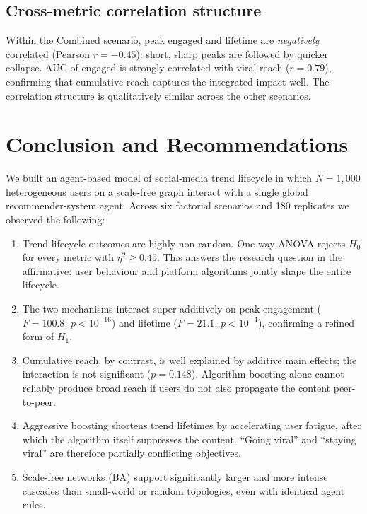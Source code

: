 \documentclass[sigconf, nonacm]{acmart}
\begin{document}
\subsection{Cross-metric correlation structure}
Within the Combined scenario, peak engaged and lifetime are
\emph{negatively} correlated (Pearson $r{=}{-}0.45$):
short, sharp peaks are followed by quicker collapse.  AUC of engaged is
strongly correlated with viral reach ($r{=}0.79$), confirming that
cumulative reach captures the integrated impact well.  The
correlation structure is qualitatively similar across the other
scenarios.

\section{Conclusion and Recommendations}

We built an agent-based model of social-media trend lifecycle in which
$N{=}1{,}000$ heterogeneous users on a scale-free graph interact with a
single global recommender-system agent.  Across six factorial
scenarios and 180 replicates we observed the following:

\begin{enumerate}
  \item Trend lifecycle outcomes are highly non-random.  One-way ANOVA
    rejects $H_0$ for every metric with $\eta^2{\ge}0.45$.  This
    answers the research question in the affirmative: user behaviour
    and platform algorithms jointly shape the entire lifecycle.
  \item The two mechanisms interact super-additively on peak engagement
    ($F{=}100.8$, $p<10^{-16}$) and lifetime ($F{=}21.1$, $p<10^{-4}$),
    confirming a refined form of $H_1$.
  \item Cumulative reach, by contrast, is well explained by additive
    main effects; the interaction is not significant ($p{=}0.148$).
    Algorithm boosting alone cannot reliably produce broad reach if
    users do not also propagate the content peer-to-peer.
  \item Aggressive boosting shortens trend lifetimes by accelerating
    user fatigue, after which the algorithm itself suppresses the
    content.  ``Going viral'' and ``staying viral'' are therefore
    partially conflicting objectives.
  \item Scale-free networks (BA) support significantly larger and more
    intense cascades than small-world or random topologies, even with
    identical agent rules.
\end{enumerate}
\end{document}
